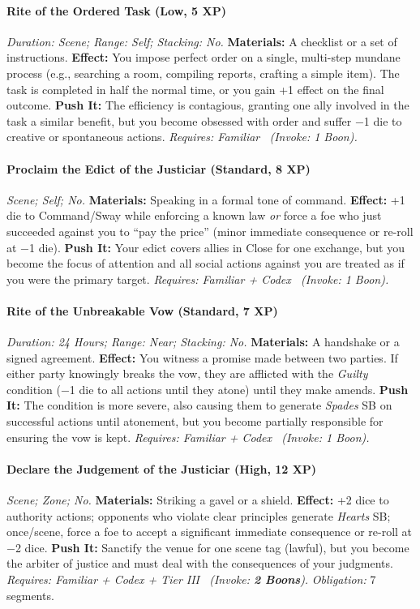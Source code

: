\paragraph{Rite of the Ordered Task (Low, 5 XP)} \emph{Duration: Scene; Range: Self; Stacking: No.}
\textbf{Materials:} A checklist or a set of instructions.
\textbf{Effect:} You impose perfect order on a single, multi-step mundane process (e.g., searching a room, compiling reports, crafting a simple item). The task is completed in half the normal time, or you gain +1 effect on the final outcome.
\textbf{Push It:} The efficiency is contagious, granting one ally involved in the task a similar benefit, but you become obsessed with order and suffer −1 die to creative or spontaneous actions.
\emph{Requires: Familiar \ (\textit{Invoke:} 1 Boon).}
\paragraph{Proclaim the Edict of the Justiciar (Standard, 8 XP)} \emph{Scene; Self; No.}
\textbf{Materials:} Speaking in a formal tone of command.
\textbf{Effect:} +1 die to Command/Sway while enforcing a known law \emph{or} force a foe who just succeeded against you to ``pay the price'' (minor immediate consequence or re-roll at −1 die).
\textbf{Push It:} Your edict covers allies in Close for one exchange, but you become the focus of attention and all social actions against you are treated as if you were the primary target.
\emph{Requires: Familiar + Codex \ (\textit{Invoke:} 1 Boon).}
\paragraph{Rite of the Unbreakable Vow (Standard, 7 XP)} \emph{Duration: 24 Hours; Range: Near; Stacking: No.}
\textbf{Materials:} A handshake or a signed agreement.
\textbf{Effect:} You witness a promise made between two parties. If either party knowingly breaks the vow, they are afflicted with the \emph{Guilty} condition (−1 die to all actions until they atone) until they make amends.
\textbf{Push It:} The condition is more severe, also causing them to generate \emph{Spades} SB on successful actions until atonement, but you become partially responsible for ensuring the vow is kept.
\emph{Requires: Familiar + Codex \ (\textit{Invoke:} 1 Boon).}
\paragraph{Declare the Judgement of the Justiciar (High, 12 XP)} \emph{Scene; Zone; No.}
\textbf{Materials:} Striking a gavel or a shield.
\textbf{Effect:} +2 dice to authority actions; opponents who violate clear principles generate \emph{Hearts} SB; once/scene, force a foe to accept a significant immediate consequence or re-roll at −2 dice.
\textbf{Push It:} Sanctify the venue for one scene tag (lawful), but you become the arbiter of justice and must deal with the consequences of your judgments.
\emph{Requires: Familiar + Codex + Tier III \ (\textit{Invoke:} \textbf{2 Boons}).}
\emph{Obligation:} 7 segments.

